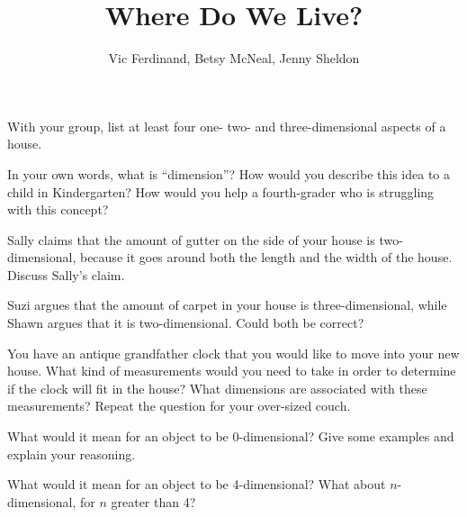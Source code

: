 \documentclass[nooutcomes]{ximera}
\title{Where Do We Live?}
\author{Vic Ferdinand, Betsy McNeal, Jenny Sheldon}
\begin{document}
\begin{abstract}
\end{abstract}


\maketitle



\begin{problem} \label{WhereLive1}
    With your group, list at least four one- two- and three-dimensional aspects of a house.
\end{problem}

\begin{problem} \label{WhereLive2}
    In your own words, what is ``dimension''?  How would you describe this idea to a child in Kindergarten?  How would you help a fourth-grader who is struggling with this concept?
\end{problem}

\begin{problem} \label{WhereLive3}
    Sally claims that the amount of gutter on the side of your house is two-dimensional, because it goes around both the length and the width of the house.  Discuss Sally's claim.
\end{problem}

\begin{problem} \label{WhereLive4}
    Suzi argues that the amount of carpet in your house is three-dimensional, while Shawn argues that it is two-dimensional.  Could both be correct?
\end{problem}

\begin{problem} \label{WhereLive5}
You have an antique grandfather clock that you would like to move into your new house.  What kind of measurements would you need to take in order to determine if the clock will fit in the house?  What dimensions are associated with these measurements?  Repeat the question for your over-sized couch.
\end{problem}

\begin{problem}
    What would it mean for an object to be 0-dimensional?  Give some examples and explain your reasoning.
\end{problem}

\begin{problem}
    What would it mean for an object to be 4-dimensional?  What about $n$-dimensional, for $n$ greater than 4?
\end{problem}
\end{document}
